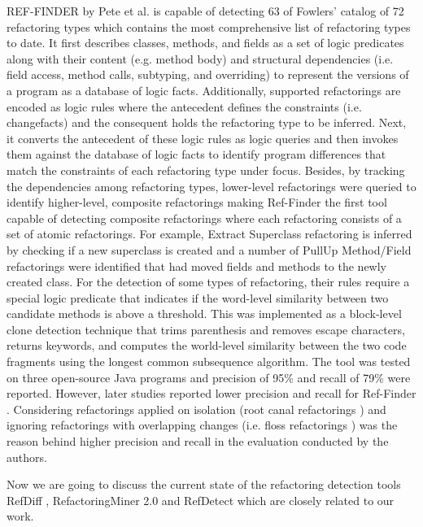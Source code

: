 \documentclass[letterpaper,12pt,onecolumn,final]{report}
\begin{document}
REF-FINDER \cite{Kim2010} by Pete et al. \cite{Prete2010} is capable of detecting 63 of Fowlers' catalog \cite{Fowler1999} of 72 refactoring types which contains the most comprehensive list of refactoring types to date. It first describes classes, methods, and fields as a set of logic predicates along with their content (e.g. method body) and structural dependencies (i.e. field access, method calls, subtyping, and overriding) to represent the versions of a program as a database of logic facts. Additionally, supported refactorings are encoded as logic rules where the antecedent defines the constraints (i.e. changefacts) and the consequent holds the refactoring type to be inferred. Next, it converts the antecedent of these logic rules as logic queries and then invokes them against the database of logic facts to identify program differences that match the constraints of each refactoring type under focus. Besides, by tracking the dependencies among refactoring types, lower-level refactorings were queried to identify higher-level, composite refactorings making Ref-Finder the first tool capable of detecting composite refactorings where each refactoring consists of a set of atomic refactorings. For example, Extract Superclass refactoring is inferred by checking if a new superclass is created and a number of PullUp Method/Field refactorings were identified that had moved fields and methods to the newly created class. For the detection of some types of refactoring, their rules require a special logic predicate that indicates if the word-level similarity between two candidate methods is above a threshold. This was implemented as a block-level clone detection technique that trims parenthesis and removes escape characters, returns keywords, and computes the world-level similarity between the two code fragments using the longest common subsequence algorithm. The tool was tested on three open-source Java programs and precision of 95\% and recall of 79\% were reported. However, later studies reported lower precision and recall for Ref-Finder \cite{Soares2013} \cite{Silva2017} \cite{Tan2019}. Considering refactorings applied on isolation (root canal refactorings \cite{MurphyHill2012}) and ignoring refactorings with overlapping changes (i.e. floss refactorings \cite{MurphyHill2012}) was the reason behind higher precision and recall in the evaluation conducted by the authors.

Now we are going to discuss the current state of the refactoring detection tools RefDiff \cite{Silva2020}, RefactoringMiner 2.0 \cite{Tsantalis2020} and RefDetect \cite{Moghadam2021} which are closely related to our work.
\end{document}
